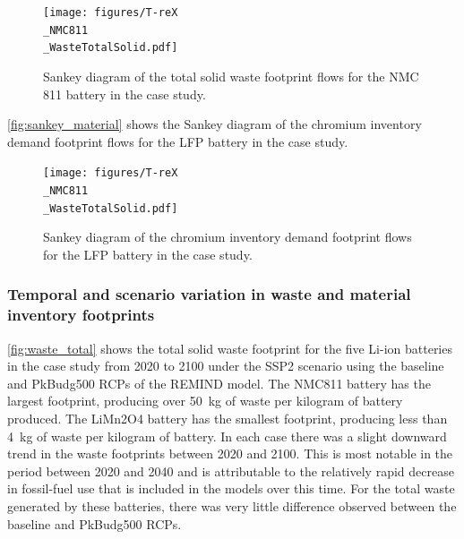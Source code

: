 \begin{figure}[H]
    \centering
    \texttt{[image: figures/T-reX\\\_NMC811\\\_WasteTotalSolid.pdf]}
    \caption{Sankey diagram of the total solid waste footprint flows for the NMC 811 battery in the case study.}\label{fig:sankey_waste}
\end{figure}

\autoref{fig:sankey_material} shows the Sankey diagram of the chromium inventory demand footprint flows for the LFP battery in the case study. 

\begin{figure}[H]
    \centering
    \texttt{[image: figures/T-reX\\\_NMC811\\\_WasteTotalSolid.pdf]}
    \caption{Sankey diagram of the chromium inventory demand footprint flows for the LFP battery in the case study.}\label{fig:sankey_material}
\end{figure}




\subsubsection{Temporal and scenario variation in waste and material inventory footprints}\label{sec:results-case_study-total_footprints}

\autoref{fig:waste_total} shows the total solid waste footprint for the five Li-ion batteries in the case study from 2020 to 2100 under the SSP2 scenario using the baseline and PkBudg500 RCPs of the REMIND model. The NMC811 battery has the largest footprint, producing over 50~kg of waste per kilogram of battery produced. The LiMn2O4 battery has the smallest footprint, producing less than 4~kg of waste per kilogram of battery. In each case there was a slight downward trend in the waste footprints between 2020 and 2100. This is most notable in the period between 2020 and 2040 and is attributable to the relatively rapid decrease in fossil-fuel use that is included in the models over this time. For the total waste generated by these batteries, there was very little difference observed between the baseline and PkBudg500 RCPs.

